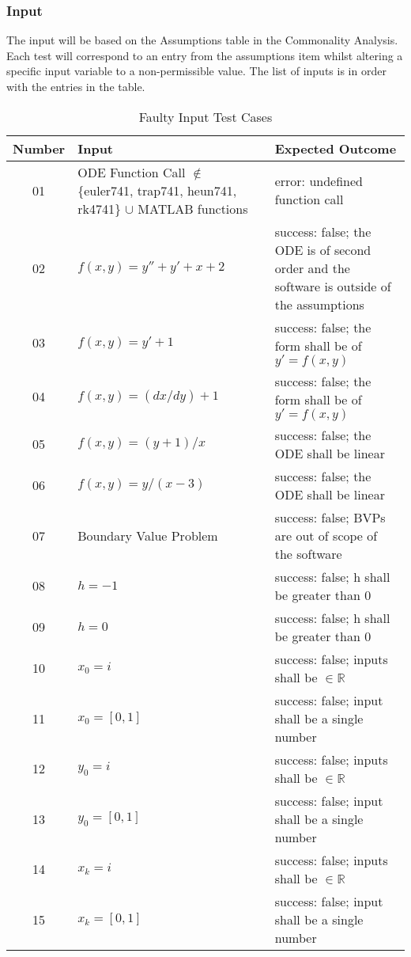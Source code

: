 \documentclass[12pt, titlepage]{article}
\begin{document}
\subsubsection{Input}
		
The input will be based on the Assumptions table in the Commonality Analysis. Each test will correspond to an 
entry from the assumptions item whilst altering a specific input variable to a non-permissible value. The list of 
inputs is in order with the entries in the table.

\begin{table} [H]
  \caption{Faulty Input Test Cases}
  \label{Table:Table_FaultyInputs}  
\begin{tabular}{|c|p{6cm}|p{8cm}|}
  \hline	
  \textbf{Number} & \textbf{Input} &\textbf{Expected Outcome}\\
  \hline 
  01 & ODE Function Call $\mathbb{\notin}$ \{euler741, trap741, heun741, rk4741\} $\mathbb{\cup}$ 
  MATLAB functions & error: undefined function call\\ \hline
  02& $f(x, y) = y'' + y' + x + 2$ & success: false; the ODE is of second order and the software is outside of the assumptions\\ \hline
  03& $f(x, y) = y' + 1$ & success: false; the form shall be of $y' = f(x, y)$\\ \hline
  04& $f(x, y) = (dx/dy) + 1$ & success: false; the form shall be of $y' = f(x, y)$\\ \hline
  05& $f(x, y) = (y + 1) / x$ & success: false; the ODE shall be linear\\ \hline
  06& $f(x, y) = y/(x-3)$ & success: false; the ODE shall be linear\\ \hline
  07& Boundary Value Problem & success: false; BVPs are out of scope of the software\\ \hline
  08& $h = -1$ & success: false; h shall be greater than 0\\ \hline
  09& $h = 0$ & success: false; h shall be greater than 0\\ \hline
  10& $x_0 = i$ & success: false; inputs shall be $\in \mathbb{R}$\\ \hline 
  11& $x_0 = [0, 1]$ & success: false; input shall be a single number\\ \hline 
  12& $y_0 = i$ & success: false; inputs shall be $\in \mathbb{R}$\\ \hline 
  13& $y_0 = [0, 1]$ & success: false; input shall be a single number\\ \hline
  14& $x_k = i$ & success: false; inputs shall be $\in \mathbb{R}$\\ \hline 
  15& $x_k = [0, 1]$ & success: false; input shall be a single number\\ \hline

\end{tabular}\\
\end{table}
\end{document}
